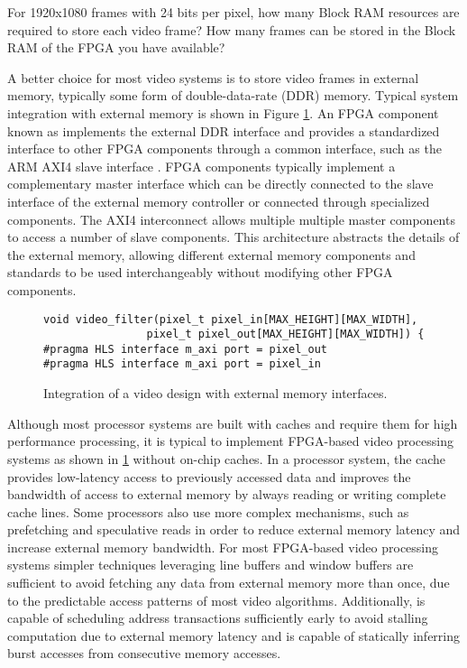\begin{exercise}
For 1920x1080 frames with 24 bits per pixel, how many Block RAM resources are required to store each video frame?  How many frames can be stored in the Block RAM of the FPGA you have available?
\end{exercise}

A better choice for most video systems is to store video frames in external memory, typically some form of double-data-rate (DDR) memory.  Typical system integration with external memory is shown in Figure \ref{fig:video:DDR_interface}.   An FPGA component known as  implements the external DDR interface and provides a standardized interface to other FPGA components through a common interface, such as the ARM AXI4 slave interface \cite{ARMAXI4}.   FPGA components typically implement a complementary master interface which can be directly connected to the slave interface of the external memory controller or connected through specialized  components.  The AXI4 interconnect allows multiple multiple master components to access a number of slave components.  This architecture abstracts the details of the external memory, allowing different external memory components and standards to be used interchangeably without modifying other FPGA components.   

\begin{figure}
\centering
\framebox{{\tiny }}
\begin{scriptsize}
\begin{lstlisting}
void video_filter(pixel_t pixel_in[MAX_HEIGHT][MAX_WIDTH],
				pixel_t pixel_out[MAX_HEIGHT][MAX_WIDTH]) {
#pragma HLS interface m_axi port = pixel_out
#pragma HLS interface m_axi port = pixel_in
\end{lstlisting}
\end{scriptsize}
\caption{Integration of a video design with external memory interfaces.}\label{fig:video:DDR_interface}
\end{figure}

Although most processor systems are built with caches and require them for high performance processing, it is typical to implement FPGA-based video processing systems as shown in \ref{fig:video:DDR_interface} without on-chip caches.  In a processor system, the cache provides low-latency access to previously accessed data and improves the bandwidth of access to external memory by always reading or writing complete cache lines. Some processors also use more complex mechanisms, such as prefetching and speculative reads in order to reduce external memory latency and increase external memory bandwidth.  For most FPGA-based video processing systems simpler techniques leveraging line buffers and window buffers are sufficient to avoid fetching any data from external memory more than once, due to the predictable access patterns of most video algorithms.  Additionally, \VHLS is capable of scheduling address transactions sufficiently early to avoid stalling computation due to external memory latency and is capable of statically inferring burst accesses from consecutive memory accesses.

